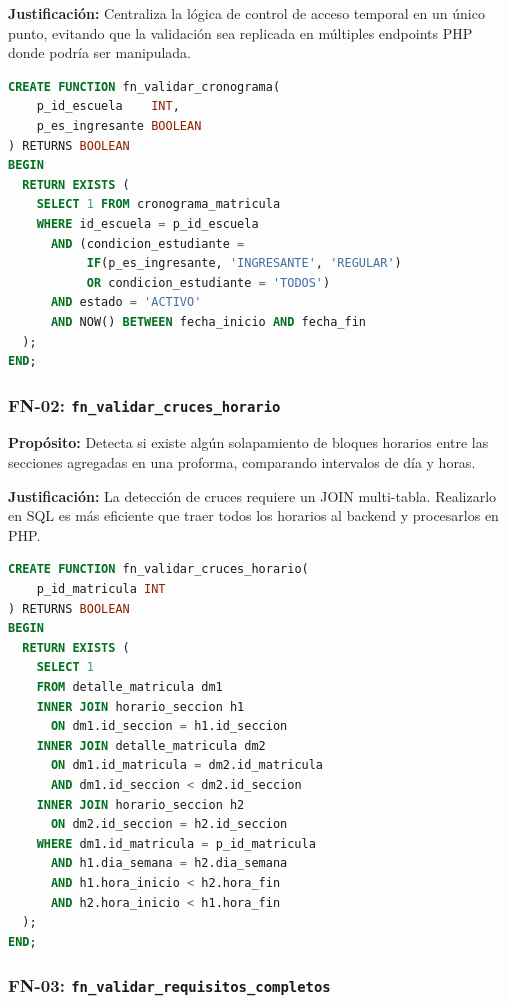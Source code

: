 \documentclass[12pt,a4paper]{article}
\begin{document}
\textbf{Justificaci\'on:} Centraliza la l\'ogica de control de acceso temporal en un \'unico punto, evitando que la validaci\'on sea replicada en m\'ultiples endpoints PHP donde podr\'ia ser manipulada.

\begin{lstlisting}[language=SQL, caption={Implementacion de fn\_validar\_cronograma}]
CREATE FUNCTION fn_validar_cronograma(
    p_id_escuela    INT,
    p_es_ingresante BOOLEAN
) RETURNS BOOLEAN
BEGIN
  RETURN EXISTS (
    SELECT 1 FROM cronograma_matricula
    WHERE id_escuela = p_id_escuela
      AND (condicion_estudiante =
           IF(p_es_ingresante, 'INGRESANTE', 'REGULAR')
           OR condicion_estudiante = 'TODOS')
      AND estado = 'ACTIVO'
      AND NOW() BETWEEN fecha_inicio AND fecha_fin
  );
END;
\end{lstlisting}

\subsubsection{FN-02: \texttt{fn\_validar\_cruces\_horario}}

\textbf{Prop\'osito:} Detecta si existe alg\'un solapamiento de bloques horarios entre las secciones agregadas en una proforma, comparando intervalos de d\'ia y horas.

\textbf{Justificaci\'on:} La detecci\'on de cruces requiere un JOIN multi-tabla. Realizarlo en SQL es m\'as eficiente que traer todos los horarios al backend y procesarlos en PHP.

\begin{lstlisting}[language=SQL, caption={Implementacion de fn\_validar\_cruces\_horario}]
CREATE FUNCTION fn_validar_cruces_horario(
    p_id_matricula INT
) RETURNS BOOLEAN
BEGIN
  RETURN EXISTS (
    SELECT 1
    FROM detalle_matricula dm1
    INNER JOIN horario_seccion h1
      ON dm1.id_seccion = h1.id_seccion
    INNER JOIN detalle_matricula dm2
      ON dm1.id_matricula = dm2.id_matricula
      AND dm1.id_seccion < dm2.id_seccion
    INNER JOIN horario_seccion h2
      ON dm2.id_seccion = h2.id_seccion
    WHERE dm1.id_matricula = p_id_matricula
      AND h1.dia_semana = h2.dia_semana
      AND h1.hora_inicio < h2.hora_fin
      AND h2.hora_inicio < h1.hora_fin
  );
END;
\end{lstlisting}

\subsubsection{FN-03: \texttt{fn\_validar\_requisitos\_completos}}
\end{document}
